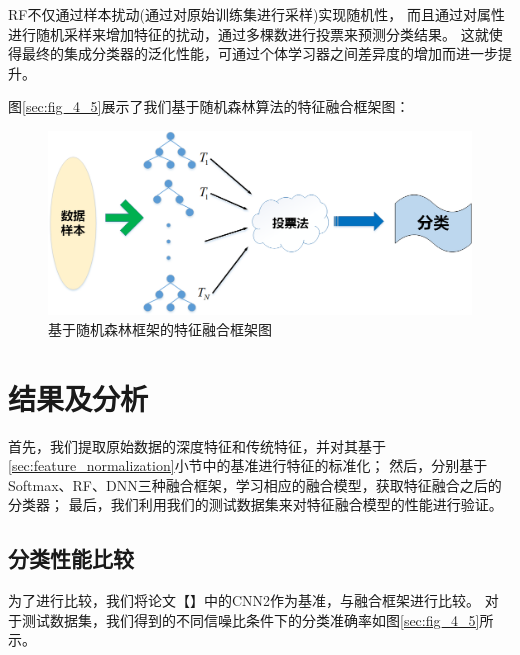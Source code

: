 RF不仅通过样本扰动(通过对原始训练集进行采样)实现随机性，
而且通过对属性进行随机采样来增加特征的扰动，通过多棵数进行投票来预测分类结果。
这就使得最终的集成分类器的泛化性能，可通过个体学习器之间差异度的增加而进一步提升。\par
图\ref{sec:fig_4_5}展示了我们基于随机森林算法的特征融合框架图：
\begin{figure}[!h]
	\centering
	\includegraphics[scale=0.5]{figures/chapter_4/fig_4_4}
	\caption{基于随机森林框架的特征融合框架图}\label{sec:fig_4_4}
\end{figure}

\section{结果及分析}
首先，我们提取原始数据的深度特征和传统特征，并对其基于\ref{sec:feature_normalization}小节中的基准进行特征的标准化；
然后，分别基于Softmax、RF、DNN三种融合框架，学习相应的融合模型，获取特征融合之后的分类器；
最后，我们利用我们的测试数据集来对特征融合模型的性能进行验证。\par

\subsection{分类性能比较}

为了进行比较，我们将论文【】中的CNN2作为基准，与融合框架进行比较。
对于测试数据集，我们得到的不同信噪比条件下的分类准确率如图\ref{sec:fig_4_5}所示。\par

